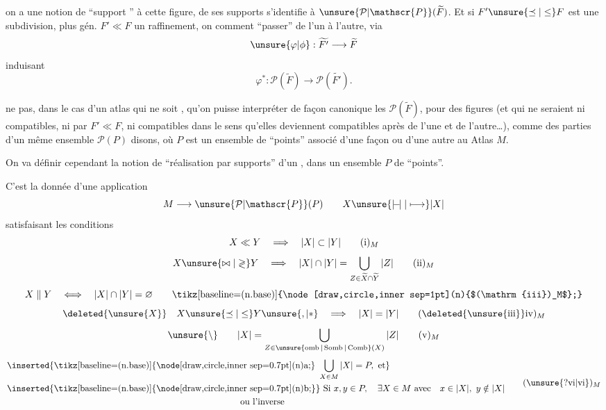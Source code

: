 
on a une notion de ``support ''  à cette figure,   de ses supports s'identifie à $\unsure{\mathcal{P}|\mathscr{P}}(\widetilde F)$. Et si $F'\unsure{\preceq|\leq}F$ est une subdivision, plus gén. $F'\ll F$ un raffinement, on  comment ``passer'' de l'un à l'autre, via
\[
\unsure{\varphi|\phi}:\widetilde{F'}\longrightarrow\widetilde F
\]
induisant
\[
\varphi^*:\mathcal{P}(\widetilde F)\longrightarrow\mathcal{P}(\widetilde{F'}).
\]

 ne  pas, dans le cas d'un atlas qui ne soit , qu'on puisse interpréter  de façon canonique les $\mathcal{P}(\widetilde F)$, pour des figures  (et qui ne seraient ni compatibles, ni  par $F'\ll F$, ni compatibles dans le sens qu'elles deviennent compatibles après  de l'une et de l'autre\ldots), comme des parties d'un même ensemble $\mathcal{P}(P)$ disons, où $P$ est un ensemble de ``points'' associé d'une façon ou d'une autre au  Atlas $M$.

On va définir cependant la notion de ``réalisation par supports'' d'un , dans un ensemble $P$ de ``points''.

C'est la donnée d'une application
\[
M\longrightarrow\unsure{\mathcal{P}|\mathscr{P}}(P)\qquad
X\unsure{\mathrel{\vert\!{-}\!\vert}|\longmapsto}|X|
\]
satisfaisant les conditions
\[
X\ll Y\quad\Longrightarrow\quad |X|\subset |Y|
\tag*{$(\mathrm{i})_M$}
\]
\[
X\unsure{\bowtie|\mathrel{\gtrless}}Y\quad\Longrightarrow\quad
|X|\cap|Y|=\bigcup_{Z\in\widetilde X\cap\widetilde Y}|Z|
\tag*{$(\mathrm{ii})_M$}
\]
\[
X\parallel Y\quad\Longleftrightarrow\quad |X|\cap|Y|=\varnothing
\tag*{\tikz[baseline=(n.base)]{\node[draw,circle,inner sep=1pt](n){$(\mathrm{iii})_M$};}}
\]
\[
\deleted{\unsure{X}}\quad X\unsure{\preceq|\leq}Y\unsure{,|\ast}\quad\Longrightarrow\quad |X|=|Y|
\tag*{$(\deleted{\unsure{\mathrm{iii}}}\mathrm{iv})_M$}
\]
\[
\unsure{\backslash}\qquad |X|=\bigcup_{Z\in\unsure{\operatorname{omb}|\operatorname{Somb}|\operatorname{Comb}}(X)}|Z|
\tag*{$(\mathrm{v})_M$}
\]
\[
\begin{aligned}
&\inserted{\text{\tikz[baseline=(n.base)]{\node[draw,circle,inner sep=0.7pt](n){a};}\ }\bigcup_{X\in M}|X|=P,\ \text{et}}\\
&\inserted{\text{\tikz[baseline=(n.base)]{\node[draw,circle,inner sep=0.7pt](n){b};}}}\ \text{Si }x,y\in P,\quad\exists X\in M\ \text{avec}\quad x\in|X|,\ y\notin|X|\\
&\hspace{26em}\text{ou l'inverse}
\end{aligned}
\tag*{$(\unsure{?\mathrm{vi}|\mathrm{vi}})_M$}
\]

